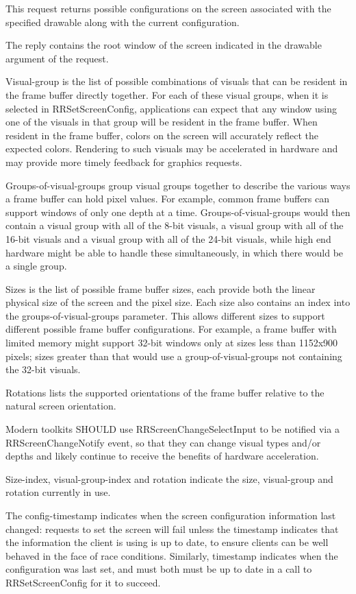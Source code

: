 \documentclass[twocolumn]{article}
\begin{document}
This request returns possible configurations on the screen associated
with the specified drawable along with the current configuration.

The reply contains the root window of the screen indicated in the
drawable argument of the request.

Visual-group is the list of possible combinations of visuals that can
be resident in the frame buffer directly together.  For each of these
visual groups, when it is selected in RRSetScreenConfig, applications
can expect that any window using one of the visuals in that group will
be resident in the frame buffer. When resident in
the frame buffer, colors on the screen will accurately reflect the
expected colors.  Rendering to such visuals may be accelerated in
hardware and may provide more timely feedback for graphics requests.

Groups-of-visual-groups group visual groups together to describe the
various ways a frame buffer can hold pixel values.  For example,
common frame buffers can support windows of only one depth at a time.
Groups-of-visual-groups would then contain a visual group with all of
the 8-bit visuals, a visual group with all of the 16-bit visuals and a
visual group with all of the 24-bit visuals, while high end hardware
might be able to handle these simultaneously, in which there would
be a single group.

Sizes is the list of possible frame buffer sizes, each provide both
the linear physical size of the screen and the pixel size.  Each size
also contains an index into the groups-of-visual-groups parameter.
This allows different sizes to support different possible frame buffer
configurations.  For example, a frame buffer with limited memory might
support 32-bit windows only at sizes less than 1152x900 pixels; sizes
greater than that would use a group-of-visual-groups not containing
the 32-bit visuals.

Rotations lists the supported orientations of the frame buffer relative to
the natural screen orientation.

Modern toolkits SHOULD use RRScreenChangeSelectInput to be notified
via a RRScreenChangeNotify event, so that they can change visual types
and/or depths and likely continue to receive the benefits of hardware
acceleration.

Size-index, visual-group-index and rotation indicate the size,
visual-group and rotation currently in use.

The config-timestamp indicates when the screen configuration
information last changed: requests to set the screen will fail unless
the timestamp indicates that the information the client is using is up
to date, to ensure clients can be well behaved in the face of race
conditions. Similarly, timestamp indicates when the configuration was
last set, and must both must be up to date in a call to
RRSetScreenConfig for it to succeed.
\end{document}
